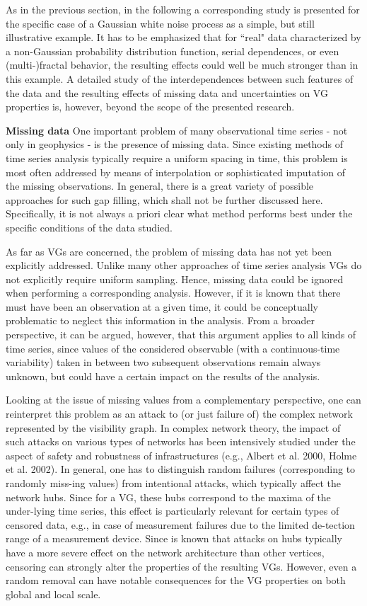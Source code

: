 		As in the previous section, in the following a corresponding study is presented for the specific case of a Gaussian white noise process as a simple, but still illustrative example. It has to be emphasized that for ``real" data characterized by a non-Gaussian probability distribution function, serial dependences, or even (multi-)fractal behavior, the resulting effects could well be much stronger than in this example. A detailed study of the interdependences between such features of the data and the resulting effects of missing data and uncertainties on VG properties is, however, beyond the scope of the presented research.

		{\bf{Missing data}} 
		One important problem of many observational time series - not only in geophysics - is the presence of missing data. Since existing methods of time series analysis typically require a uniform spacing in time, this problem is most often addressed by means of interpolation or sophisticated imputation of the missing observations. In general, there is a great variety of possible approaches for such gap filling, which shall not be further discussed here. Specifically, it is not always a priori clear what method performs best under the specific conditions of the data studied.
		
		As far as VGs are concerned, the problem of missing data has not yet been explicitly addressed. Unlike many other approaches of time series analysis VGs do not explicitly require uniform sampling. Hence, missing data could be ignored when performing a corresponding analysis. However, if it is known that there must have been an observation at a given time, it could be conceptually problematic to neglect this information in the analysis. From a broader perspective, it can be argued, however, that this argument applies to all kinds of time series, since values of the considered observable (with a continuous-time variability) taken in between two subsequent observations remain always unknown, but could have a certain impact on the results of the analysis. 
		
		Looking at the issue of missing values from a complementary perspective, one can reinterpret this problem as an attack to (or just failure of) the complex network represented by the visibility graph. In complex network theory, the impact of such attacks on various types of networks has been intensively studied under the aspect of safety and robustness of infrastructures (e.g., Albert et al. 2000, Holme et al. 2002). In general, one has to distinguish random failures (corresponding to randomly miss-ing values) from intentional attacks, which typically affect the network hubs. Since for a VG, these hubs correspond to the maxima of the under-lying time series, this effect is particularly relevant for certain types of censored data, e.g., in case of measurement failures due to the limited de-tection range of a measurement device. Since is known that attacks on hubs typically have a more severe effect on the network architecture than other vertices, censoring can strongly alter the properties of the resulting VGs. However, even a random removal can have notable consequences for the VG properties on both global and local scale.
		
